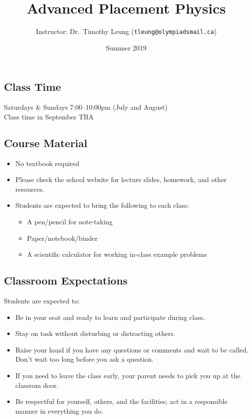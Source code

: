 \documentclass[11pt]{article}
\title{\vspace{-0.2in}\textbf{Advanced Placement Physics}}
\author{Instructor: Dr.\ Timothy Leung (\texttt{tleung@olympiadsmail.ca})}
\date{Summer 2019}
\begin{document}
\maketitle

\subsection{Class Time}
Saturdays \& Sundays 7:00--10:00pm (July and August)\\
Class time in September TBA

\subsection{Course Material}
\begin{itemize}[itemsep=0pt,leftmargin=12pt]
\item No textbook required
\item Please check the school website for lecture slides, homework, and other
  resources.
\item Students are expected to bring the following to each class:
  \begin{itemize}[noitemsep,topsep=0pt]
  \item A pen/pencil for note-taking
  \item Paper/notebook/binder
  \item A scientific calculator for working in-class example problems
  \end{itemize}
\end{itemize}

\subsection{Classroom Expectations}
Students are expected to:
\begin{itemize}[itemsep=0pt,leftmargin=12pt]
\item Be in your seat and ready to learn and participate during class.
\item Stay on task without disturbing or distracting others.
\item Raise your hand if you have any questions or comments and wait to be
  called. Don't wait too long before you ask a question.
\item If you need to leave the class early, your parent needs to pick you up at
  the classrom door.
\item Be respectful for yourself, others, and the facilities; act in
  a responsible manner in everything you do.
\end{itemize}
\end{document}
